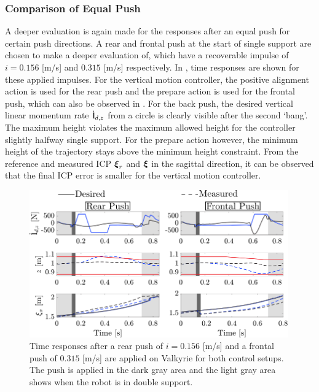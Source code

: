 \subsubsection{Comparison of Equal Push} 
A deeper evaluation is again made for the responses after an equal push for certain push directions. A rear and frontal push at the start of single support are chosen to make a deeper evaluation of, which have a recoverable impulse of $i=0.156$ [m/s] and $0.315$ [m/s] respectively. In , time responses are shown for these applied impulses. For the vertical motion controller, the positive alignment action is used for the rear push and the prepare action is used for the frontal push, which can also be observed in . For the back push, the desired vertical linear momentum rate $\dot{\mathbf{l}}_{d,z}$ from a circle is clearly visible after the second `bang'. The maximum height violates the maximum allowed height for the controller slightly halfway single support. For the prepare action however, the minimum height of the trajectory stays above the minimum height constraint. From the reference and measured \ac{ICP} $\boldsymbol{\xi}_r$ and $\boldsymbol{\xi}$ in the sagittal direction, it can be observed that the final \ac{ICP} error is smaller for the vertical motion controller.
\begin{figure}
     \centering
        \includegraphics[width=0.99\textwidth]{STYLESTUFF/walkplot.png}
    \caption{Time responses after a rear push of $i=0.156$ [m/s] and a frontal push of $0.315$ [m/s] are applied on Valkyrie for both control setups. The push is applied in the dark gray area and the light gray area shows when the robot is in double support.}
    \label{fig:walkplot}
\end{figure}


